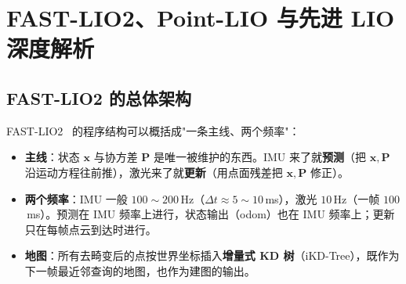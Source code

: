 \chapter{FAST-LIO2、Point-LIO 与先进 LIO 深度解析}\label{ch:17-advanced-lio}

\usetikzlibrary{arrows.meta, positioning, calc, shapes.geometric}


\section{FAST-LIO2 的总体架构}\label{sec:17-arch}

FAST-LIO2~\cite{xu2022fastlio2} 的程序结构可以概括成"一条主线、两个频率"：

\begin{itemize}
  \item \textbf{主线}：状态 $\bm{x}$ 与协方差 $\bm{P}$ 是唯一被维护的东西。IMU 来了就\textbf{预测}（把 $\bm{x},\bm{P}$ 沿运动方程往前推），激光来了就\textbf{更新}（用点面残差把 $\bm{x},\bm{P}$ 修正）。
  \item \textbf{两个频率}：IMU 一般 $100\sim200$\,Hz（$\Delta t\approx5\sim10$\,ms），激光 $10$\,Hz（一帧 $100$\,ms）。预测在 IMU 频率上进行，状态输出（odom）也在 IMU 频率上；更新只在每帧点云到达时进行。
  \item \textbf{地图}：所有去畸变后的点按世界坐标插入\textbf{增量式 KD 树}（iKD-Tree），既作为下一帧最近邻查询的地图，也作为建图的输出。
\end{itemize}

